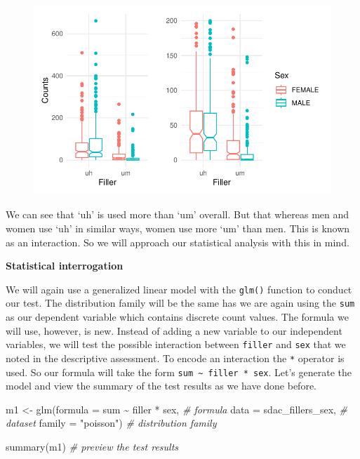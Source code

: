 \documentclass[
  letterpaper,
]{scrbook}
\newenvironment{Shaded}{\begin{snugshade}}{\end{snugshade}}
\newcommand{\AttributeTok}[1]{\textcolor[rgb]{0.00,0.00,0.00}{#1}}
\newcommand{\CommentTok}[1]{\textcolor[rgb]{0.00,0.00,0.00}{\textit{#1}}}
\newcommand{\FunctionTok}[1]{\textcolor[rgb]{0.00,0.00,0.00}{#1}}
\newcommand{\NormalTok}[1]{\textcolor[rgb]{0.00,0.00,0.00}{#1}}
\newcommand{\OtherTok}[1]{\textcolor[rgb]{0.00,0.00,0.00}{#1}}
\newcommand{\SpecialCharTok}[1]{\textcolor[rgb]{0.00,0.00,0.00}{#1}}
\newcommand{\StringTok}[1]{\textcolor[rgb]{0.00,0.00,0.00}{#1}}
\begin{document}
\begin{figure}[h]

{\centering \includegraphics{./inference_files/figure-pdf/i-mulit-cont-visual-1.pdf}

}

\end{figure}

We can see that `uh' is used more than `um' overall. But that whereas
men and women use `uh' in similar ways, women use more `um' than men.
This is known as an interaction. So we will approach our statistical
analysis with this in mind.

\textbf{Statistical interrogation}

We will again use a generalized linear model with the \texttt{glm()}
function to conduct our test. The distribution family will be the same
has we are again using the \texttt{sum} as our dependent variable which
contains discrete count values. The formula we will use, however, is
new. Instead of adding a new variable to our independent variables, we
will test the possible interaction between \texttt{filler} and
\texttt{sex} that we noted in the descriptive assessment. To encode an
interaction the \texttt{*} operator is used. So our formula will take
the form \texttt{sum\ \textasciitilde{}\ filler\ *\ sex}. Let's generate
the model and view the summary of the test results as we have done
before.

\begin{Shaded}
\begin{Highlighting}[]
\NormalTok{m1 }\OtherTok{\textless{}{-}} 
  \FunctionTok{glm}\NormalTok{(}\AttributeTok{formula =}\NormalTok{ sum }\SpecialCharTok{\textasciitilde{}}\NormalTok{ filler }\SpecialCharTok{*}\NormalTok{ sex, }\CommentTok{\# formula}
      \AttributeTok{data =}\NormalTok{ sdac\_fillers\_sex, }\CommentTok{\# dataset}
      \AttributeTok{family =} \StringTok{"poisson"}\NormalTok{) }\CommentTok{\# distribution family}

\FunctionTok{summary}\NormalTok{(m1) }\CommentTok{\# preview the test results}
\end{Highlighting}
\end{Shaded}
\end{document}
